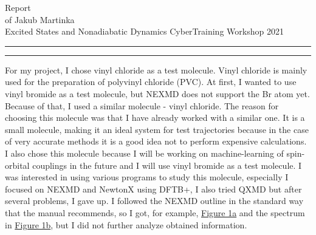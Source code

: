 \documentclass{article}
\newcommand{\soptitle}{Report}
\newcommand{\yourname}{Jakub Martinka}
\begin{document}
\begin{center}\LARGE\soptitle\\
\large of \yourname\ \\Excited States and Nonadiabatic Dynamics CyberTraining Workshop 2021
\end{center}

\hrule
\vspace{1pt}
\hrule height 1pt

\bigskip
\vspace{1cm}
For my project, I chose vinyl chloride as a test molecule. Vinyl chloride is mainly used for the preparation of polyvinyl chloride (PVC). At first, I wanted to use vinyl bromide as a test molecule, but NEXMD does not support the Br atom yet. Because of that, I used a similar molecule - vinyl chloride. The reason for choosing this molecule was that I have already worked with a similar one. It is a small molecule, making it an ideal system for test trajectories because in the case of very accurate methods it is a good idea not to perform expensive calculations. I also chose this molecule because I will be working on machine-learning of spin-orbital couplings in the future and I will use vinyl bromide as a test molecule. I was interested in using various programs to study this molecule, especially I focused on NEXMD and NewtonX using DFTB+, I also tried QXMD but after several problems, I gave up. I followed the NEXMD outline in the standard way that the manual recommends, so I got, for example, \hyperref[nexmd]{Figure 1a} and the spectrum in \hyperref[nexmd]{Figure 1b}, but I did not further analyze obtained information. \vspace{.4cm}
\end{document}
